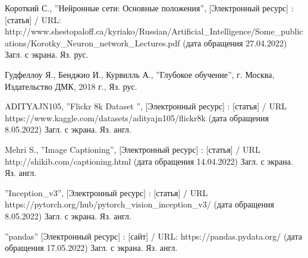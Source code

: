 \documentclass[bachelor, och, coursework]{SCWorks}
\begin{document}
\begin{thebibliography}{99}
     Короткий С., ''Нейронные сети: Основные положения'',
    [Электронный ресурс] : [статья] / URL:
    http://www.shestopaloff.ca/kyriako/Russian/Artificial_Intelligence/Some_publications/Korotky_Neuron_network_Lectures.pdf
    (дата обращения 27.04.2022) Загл. с экрана. Яз. рус.
    
     Гудфеллоу Я., Бенджио И., Курвилль А., ''Глубокое обучение'',
    г. Москва, Издательство ДМК, 2018 г., Яз. рус.
    
     ADITYAJN105, ''Flickr 8k Dataset '', [Электронный ресурс]
    : [статья] / URL https://www.kaggle.com/datasets/adityajn105/flickr8k (дата
    обращения 8.05.2022) Загл. с экрана. Яз. англ.


    
     Mehri S., ''Image Captioning'', [Электронный ресурс]
    : [статья] / URL http://shikib.com/captioning.html (дата обращения
    14.04.2022) Загл. с экрана. Яз. англ.

     ''Inception_v3'', [Электронный ресурс] : [статья] / URL
    https://pytorch.org/hub/pytorch_vision_inception_v3/ (дата обращения
    8.05.2022) Загл. с экрана. Яз. англ.

     ''pandas'' [Электронный ресурс] : [сайт] / URL:
    https://pandas.pydata.org/ (дата обращения 17.05.2022) Загл. с экрана. Яз.
    англ.

\end{thebibliography}

\appendix




\end{document}
